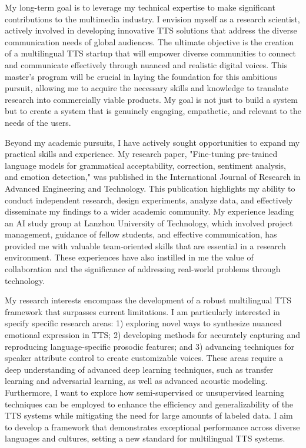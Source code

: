 \documentclass[12pt,a4paper]{article}
\begin{document}
\begin{CJK*}{UTF8}{gbsn}
My long-term goal is to leverage my technical expertise to make significant contributions to the multimedia industry. I envision myself as a research scientist, actively involved in developing innovative TTS solutions that address the diverse communication needs of global audiences. The ultimate objective is the creation of a multilingual TTS startup that will empower diverse communities to connect and communicate effectively through nuanced and realistic digital voices. This master's program will be crucial in laying the foundation for this ambitious pursuit, allowing me to acquire the necessary skills and knowledge to translate research into commercially viable products. My goal is not just to build a system but to create a system that is genuinely engaging, empathetic, and relevant to the needs of the users.\newline

Beyond my academic pursuits, I have actively sought opportunities to expand my practical skills and experience. My research paper, "Fine-tuning pre-trained language models for grammatical acceptability, correction, sentiment analysis, and emotion detection," was published in the International Journal of Research in Advanced Engineering and Technology. This publication highlights my ability to conduct independent research, design experiments, analyze data, and effectively disseminate my findings to a wider academic community. My experience leading an AI study group at Lanzhou University of Technology, which involved project management, guidance of fellow students, and effective communication, has provided me with valuable team-oriented skills that are essential in a research environment. These experiences have also instilled in me the value of collaboration and the significance of addressing real-world problems through technology.\newline

My research interests encompass the development of a robust multilingual TTS framework that surpasses current limitations. I am particularly interested in specify specific research areas: 1) exploring novel ways to synthesize nuanced emotional expression in TTS; 2) developing methods for accurately capturing and reproducing language-specific prosodic features; and 3) advancing techniques for speaker attribute control to create customizable voices. These areas require a deep understanding of advanced deep learning techniques, such as transfer learning and adversarial learning, as well as advanced acoustic modeling. Furthermore, I want to explore how semi-supervised or unsupervised learning techniques can be employed to enhance the efficiency and generalizability of the TTS systems while mitigating the need for large amounts of labeled data. I aim to develop a framework that demonstrates exceptional performance across diverse languages and cultures, setting a new standard for multilingual TTS systems. \newline


\end{CJK*}
\end{document}
